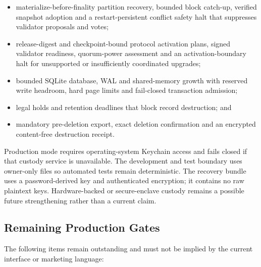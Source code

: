 \begin{itemize}
  \item materialize-before-finality partition recovery, bounded block catch-up,
        verified snapshot adoption and a restart-persistent conflict safety
        halt that suppresses validator proposals and votes;
  \item release-digest and checkpoint-bound protocol activation plans, signed
        validator readiness, quorum-power assessment and an activation-boundary
        halt for unsupported or insufficiently coordinated upgrades;
  \item bounded SQLite database, WAL and shared-memory growth with reserved
        write headroom, hard page limits and fail-closed transaction admission;
  \item legal holds and retention deadlines that block record destruction; and
  \item mandatory pre-deletion export, exact deletion confirmation and an
        encrypted content-free destruction receipt.
\end{itemize}

Production mode requires operating-system Keychain access and fails closed if
that custody service is unavailable.  The development and test boundary uses
owner-only files so automated tests remain deterministic.  The recovery bundle
uses a password-derived key and authenticated encryption; it contains no raw
plaintext keys.  Hardware-backed or secure-enclave custody remains a possible
future strengthening rather than a current claim.

\subsection{Remaining Production Gates}

The following items remain outstanding and must not be implied by the current
interface or marketing language:


